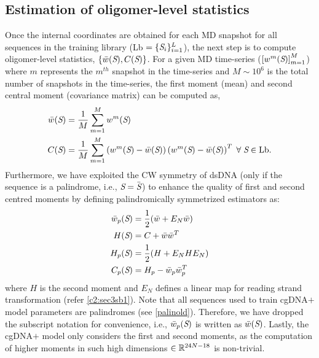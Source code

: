 \subsection{Estimation of oligomer-level statistics} \label{c2:s4:sb1}
Once the internal coordinates are obtained for each MD snapshot for all sequences in the training library (Lb $=\{{\textit{S}}_i\}_{i=1}^{L}$), the next step is to compute oligomer-level statistics, $\{\bar{w}({\textit{S}}),C({\textit{S}})\}$.  
For a given MD time-series ($\left[w^m({\textit{S}})\right]_{m=1}^{M}$) where $m$ represents the $m^{th}$ snapshot in the time-series and $M \sim 10^6$ is the total number of snapshots in the time-series, the first moment (mean) and second central moment (covariance matrix) can be computed as,
\begin{equation}
\label{estimator}
\begin{split}
\bar{w}({\textit{S}}) &= \frac{1}{M} \sum_{m=1}^M w^m({\textit{S}}) \\ C({\textit{S}}) &= \frac{1}{M} \sum_{m=1}^M \left(w^m({\textit{S}}) - \bar{w}({\textit{S}})\right) \left(w^m({\textit{S}}) - \bar{w}({\textit{S}})\right)^T \; \forall \; {\textit{S}} \in {\text{Lb}}.
\end{split}
\label{c2:eq_moments}
\end{equation}
Furthermore, we have exploited the CW symmetry of dsDNA (only if the sequence is a palindrome, i.e., ${\textit{S}} = \bar{{\textit{S}}}$) to enhance the quality of first and second centred moments by defining palindromically symmetrized estimators
as:
\begin{equation}
\label{palinestimator}
\begin{split}
\bar{w}_p({\textit{S}}) &= \frac{1}{2}(\bar{w}+E_{N}\bar{w}) \\ 
H({\textit{S}}) & = C + \bar{w}\bar{w}^T\\
H_p({\textit{S}}) & = \frac{1}{2}(H+E_{N}HE_{N}) \\
C_p({\textit{S}}) & = H_p - \bar{w}_p\bar{w}_p^T
\end{split}
\end{equation}
where $H$ is the second moment and $E_{N}$ defines a linear map for reading strand transformation (refer \cref{c2:sec3sb1}). 
Note that all sequences used to train cgDNA$+$ model parameters are palindromes (see \cref{palinold}).
Therefore, we have dropped the subscript notation for convenience, i.e., $\bar{w}_p({\textit{S}})$ is written as $\bar{w}({\textit{S}})$.
Lastly, the cgDNA$+$ model only considers the first and second moments, as the computation of higher moments in such high dimensions $\in {\mathbb R}^{24N-18}$ is non-trivial. 

